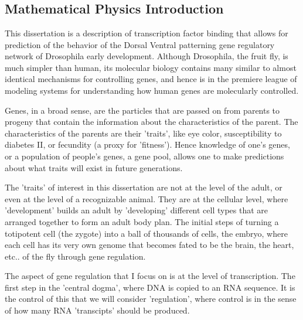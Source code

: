 \chapter{}
\section{Mathematical Physics Introduction}
This dissertation is a description of transcription factor binding that allows for prediction of the behavior of the Dorsal Ventral patterning gene regulatory network of Drosophila early development.  Although Drosophila, the fruit fly, is much simpler than human, its molecular biology contains many similar to almost identical mechanisms for controlling genes, and hence is in the premiere league of modeling systems for understanding how human genes are molecularly controlled.  

Genes, in a broad sense, are the particles that are passed on from parents to progeny that contain the information about the characteristics of the parent.  The characteristics of the parents are their 'traits', like eye color, susceptibility to diabetes II, or fecundity (a proxy for 'fitness').  Hence knowledge of one's genes, or a population of people's genes, a gene pool, allows one to make predictions about what traits will exist in future generations.

The 'traits' of interest in this dissertation are not at the level of the adult, or even at the level of a recognizable animal.  They are at the cellular level, where 'development' builds an adult by 'developing' different cell types that are arranged together to form an adult body plan.  The initial steps of turning a totipotent cell (the zygote) into a ball of thousands of cells, the embryo, where each cell has its very own genome that becomes fated to be the brain, the heart, etc.. of the fly through gene regulation.

The aspect of gene regulation that I focus on is at the level of transcription.  The first step in the 'central dogma', where DNA is copied to an RNA sequence.  It is the control of this that we will consider 'regulation', where control is in the sense of how many RNA 'transcipts' should be produced.
  
